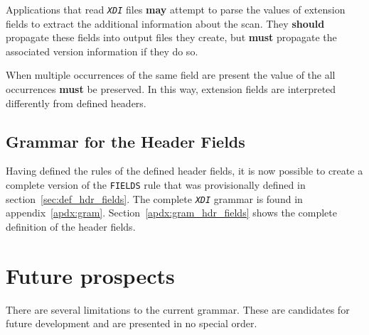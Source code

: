\documentclass{article}
\newcommand{\sltt}[1]{\texttt{\textsl{#1}}}
\newcommand{\xdi}{\sltt{XDI}}
\begin{document}
Applications that read {\xdi} files \textbf{may} attempt to parse the
values of extension fields to extract the additional information about
the scan.  They \textbf{should} propagate these fields into output
files they create, but \textbf{must} propagate the associated version
information if they do so.

When multiple occurrences of the same field are present the value of
the all occurrences \textbf{must} be preserved.  In this way,
extension fields are interpreted differently from defined headers.

\subsection{Grammar for the Header Fields}
\label{sec:ixsif_fields_grammar}

Having defined the rules of the defined header fields, it is now
possible to create a complete version of the \texttt{FIELDS} rule that
was provisionally defined in section~\ref{sec:def_hdr_fields}.  The
complete {\xdi} grammar is found in appendix~\ref{apdx:gram}.
Section~\ref{apdx:gram_hdr_fields} shows the complete definition of
the header fields.

\section{Future prospects}
\label{sec:future}

There are several limitations to the current grammar.  These are
candidates for future development and are presented in no special
order.
\end{document}
